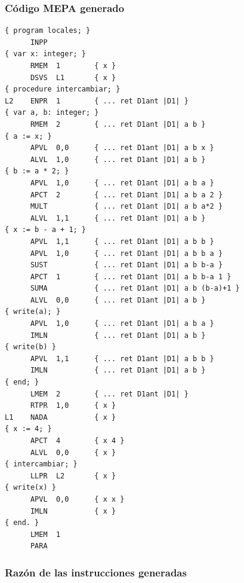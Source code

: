 \documentclass[12pt]{article}
\begin{document}
\subsubsection*{Código MEPA generado}
\begin{lstlisting}[frame=single, basicstyle=\ttfamily\small, breaklines=true]
{ program locales; }
      INPP
{ var x: integer; }
      RMEM  1        { x }
      DSVS  L1       { x }
{ procedure intercambiar; }
L2    ENPR  1        { ... ret D1ant |D1| }
{ var a, b: integer; }
      RMEM  2        { ... ret D1ant |D1| a b }
{ a := x; }
      APVL  0,0      { ... ret D1ant |D1| a b x }
      ALVL  1,0      { ... ret D1ant |D1| a b }
{ b := a * 2; }
      APVL  1,0      { ... ret D1ant |D1| a b a }
      APCT  2        { ... ret D1ant |D1| a b a 2 }
      MULT           { ... ret D1ant |D1| a b a*2 }
      ALVL  1,1      { ... ret D1ant |D1| a b }
{ x := b - a + 1; }
      APVL  1,1      { ... ret D1ant |D1| a b b }
      APVL  1,0      { ... ret D1ant |D1| a b b a }
      SUST           { ... ret D1ant |D1| a b b-a }
      APCT  1        { ... ret D1ant |D1| a b b-a 1 }
      SUMA           { ... ret D1ant |D1| a b (b-a)+1 }
      ALVL  0,0      { ... ret D1ant |D1| a b }
{ write(a); }
      APVL  1,0      { ... ret D1ant |D1| a b a }
      IMLN           { ... ret D1ant |D1| a b }
{ write(b) }
      APVL  1,1      { ... ret D1ant |D1| a b b }
      IMLN           { ... ret D1ant |D1| a b }
{ end; }
      LMEM  2        { ... ret D1ant |D1| }
      RTPR  1,0      { x }
L1    NADA           { x }
{ x := 4; }
      APCT  4        { x 4 }
      ALVL  0,0      { x }
{ intercambiar; }
      LLPR  L2       { x }
{ write(x) }
      APVL  0,0      { x x }
      IMLN           { x }
{ end. }
      LMEM  1
      PARA
\end{lstlisting}

\subsubsection*{Razón de las instrucciones generadas}
\end{document}
